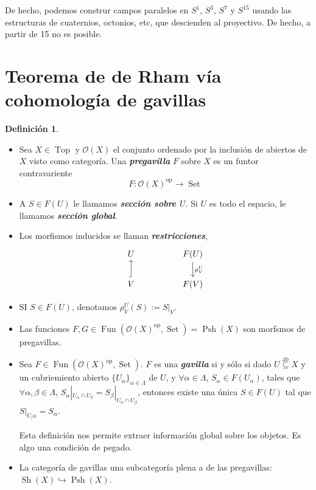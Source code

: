 \documentclass[spanish]{book}
\theoremstyle{definition}
\newtheorem*{defn}{Definición}
\begin{document}
De hecho, podemos construr campos paralelos en $S^1$, $S^3$, $S^7$ y $S^{15}$ usando las estructuras de cuaternios, octonios, etc, que descienden al proyectivo. De hecho, a partir de 15 no es posible.

\section{Teorema de de Rham vía cohomología de gavillas}
\begin{defn}\leavevmode
\begin{itemize}
	\item 	Sea $X\in\operatorname{Top}$ y $\mathcal{O}(X)$ el conjunto ordenado por la inclusión de abiertos de $X$ visto como categoría. Una \textbf{\textit{pregavilla}} $F$ sobre $X$ es un funtor contravariente
	\[F:\mathcal{O}(X)^{\operatorname{op}}\to\operatorname{Set}\]
	\item A $S\in F(U)$ le llamamos \textbf{\textit{sección sobre $U$}}. Si $U$ es todo el espacio, le llamamos \textbf{\textit{sección global}}.
	\item Los morfismos inducidos se llaman \textbf{\textit{restricciones}},
	\[\begin{tikzcd}
		U&&F(U)\arrow[d,"\rho^U_V"]\\
		V\arrow[u,hook]&&F(V)
	\end{tikzcd}\]
	\item SI $S\in F(U)$, denotamos $\rho_V^U(S):=S|_V$.
	\item Las funciones $F,G\in\operatorname{Fun}(\mathcal{O}(X)^{\operatorname{op}},\operatorname{Set})=\operatorname{Psh}(X)$ son morfsmos de pregavillas.
		\item Sea $F\in\operatorname{Fun}(\mathcal{O}(X)^{\operatorname{op}},\operatorname{Set})$. $F$ es una \textbf{\textit{gavilla}} si y sólo si dado $U\overset{\operatorname{ab}}{\subseteq}X$ y un cubriemiento abierto $\{U_\alpha\}_{\alpha\in \Lambda}$ de $U$, y $\forall\alpha\in\Lambda$, $S_\alpha\in F(U_\alpha)$, tales que $\forall\alpha,\beta\in\Lambda$, $S_\alpha|_{U_\alpha\cap U_\beta}=S_\beta|_{U_\alpha\cap U_\beta}$, entonces existe una única $S\in F(U)$ tal que $S|_{U_|\alpha}=S_\alpha$.
		
		Esta definición nos permite extraer información global sobre los objetos. Es algo una condición de pegado.
		\item La categoría de gavillas una subcategoría plena a de las pregavillas: $\operatorname{Sh}(X)\hookrightarrow\operatorname{Psh}(X)$.
\end{itemize}
\end{defn}
\end{document}
